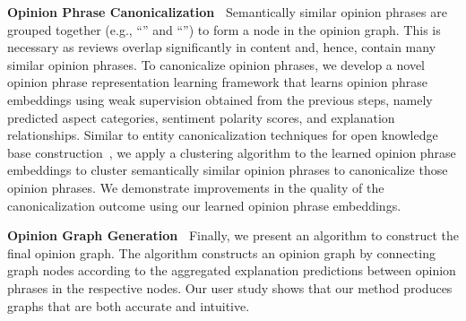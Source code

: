 \noindent \textbf{Opinion Phrase Canonicalization~}  Semantically similar opinion phrases are grouped together (e.g., ``'' and ``'') to form a node in the opinion graph. This is necessary as reviews  
overlap significantly in content and, hence, contain many similar opinion phrases.
To canonicalize opinion phrases, we develop a novel opinion phrase representation learning framework that learns opinion phrase embeddings using weak supervision obtained from the previous steps, namely predicted aspect categories, sentiment polarity scores, and explanation relationships. Similar to entity canonicalization techniques for open knowledge base construction~\cite{Vahishth:2018:CESI,Chen:2019:CanonicalizingKB}, we apply a clustering algorithm to the learned opinion phrase embeddings to cluster semantically similar opinion phrases to canonicalize those opinion phrases. 
We demonstrate improvements in the quality of the canonicalization outcome using our learned opinion phrase embeddings.


\smallskip

\noindent \textbf{Opinion Graph Generation~} Finally, we present an algorithm to construct the final opinion graph. The algorithm constructs an opinion graph by connecting graph nodes according to the aggregated explanation predictions between opinion phrases in the respective nodes. Our user study shows that our method produces graphs that are both accurate and intuitive.
